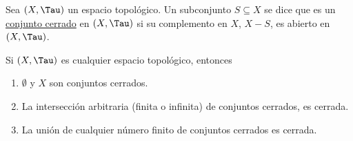 \begin{defn}\label{defn:1.1.5}
    Sea $(X, \Tau)$ un espacio topológico. Un subconjunto $S \subseteq X$ se dice que es un \ul{conjunto cerrado} en $(X, \Tau)$ si su complemento en $X$, $X - S$, es abierto en $(X, \Tau)$.
\end{defn}

\begin{pro}
    Si $(X, \Tau)$ es cualquier espacio topológico, entonces
    
    \begin{enumerate}
        \item $\emptyset$ y $X$ son conjuntos cerrados.
        \item La intersección arbitraria (finita o infinita) de conjuntos cerrados, es cerrada.
        \item La unión de cualquier número finito de conjuntos cerrados es cerrada.
    \end{enumerate}
\end{pro}

